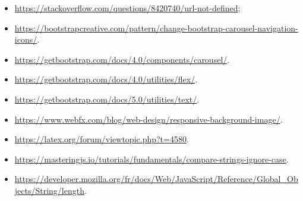 \documentclass[12pt, french]{article}
\begin{document}
\begin{itemize}
    \item \url{https://stackoverflow.com/questions/8420740/url-not-defined};
    \item \url{https://bootstrapcreative.com/pattern/change-bootstrap-carousel-navigation-icons/}.
    \item \url{https://getbootstrap.com/docs/4.0/components/carousel/}.
    \item \url{https://getbootstrap.com/docs/4.0/utilities/flex/}.
    \item \url{https://getbootstrap.com/docs/5.0/utilities/text/}.
    \item \url{https://www.webfx.com/blog/web-design/responsive-background-image/}.
    \item \url{https://latex.org/forum/viewtopic.php?t=4580}.
    \item \url{https://masteringjs.io/tutorials/fundamentals/compare-strings-ignore-case}.
    \item \url{https://developer.mozilla.org/fr/docs/Web/JavaScript/Reference/Global_Objects/String/length}.
    \newpage
	\printbibliography
\end{itemize}
\end{document}
